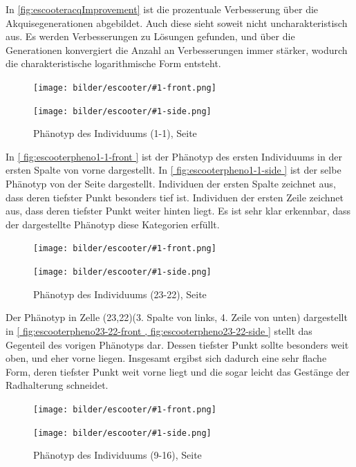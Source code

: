 In \cref{fig:escooteracqImprovement} ist die prozentuale Verbesserung über die Akquisegenerationen abgebildet.
Auch diese sieht soweit nicht uncharakteristisch aus.
Es werden Verbesserungen zu Lösungen gefunden, und über die Generationen konvergiert die Anzahl an Verbesserungen immer stärker, wodurch die charakteristische logarithmische Form entsteht.

\newcommand{\escooterpheno}[1]{
\begin{figure}[h]
	\centering
	\begin{minipage}{0.5\textwidth}
		\centering
		\texttt{[image: bilder/escooter/\#1-front.png]}
		\caption{Phänotyp des Individuums (#1), vorne}
		\label{fig:escooterpheno#1-front}
	\end{minipage}\hfill
	\begin{minipage}{0.5\textwidth}
		\centering
		\texttt{[image: bilder/escooter/\#1-side.png]}
		\caption{Phänotyp des Individuums (#1), Seite}
		\label{fig:escooterpheno#1-side}
	\end{minipage}
\end{figure}
}

\newcommand{\escref}[2]{
	fig:escooterpheno#1-#2
}

\newcommand{\allrefEscooter}[1]{
	\cref{\escref{#1}{front},\escref{#1}{side}}
}

\escooterpheno{1-1}

In \cref{\escref{1-1}{front}} ist der Phänotyp des ersten Individuums in der ersten Spalte von vorne dargestellt.
In \cref{\escref{1-1}{side}} ist der selbe Phänotyp von der Seite dargestellt.
Individuen der ersten Spalte zeichnet aus, dass deren tiefster Punkt besonders tief ist.
Individuen der ersten Zeile zeichnet aus, dass deren tiefster Punkt weiter hinten liegt.
Es ist sehr klar erkennbar, dass der dargestellte Phänotyp diese Kategorien erfüllt.


\escooterpheno{23-22}

Der Phänotyp in Zelle (23,22)(3. Spalte von links, 4. Zeile von unten) dargestellt in \allrefEscooter{23-22} stellt das Gegenteil des vorigen Phänotyps dar.
Dessen tiefster Punkt sollte besonders weit oben, und eher vorne liegen.
Insgesamt ergibst sich dadurch eine sehr flache Form, deren tiefster Punkt weit vorne liegt und die sogar leicht das Gestänge der Radhalterung schneidet.

\escooterpheno{9-16}

